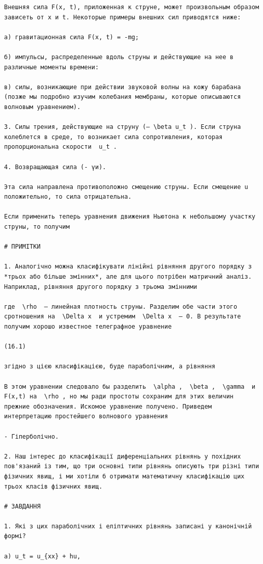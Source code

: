 \documentclass[
  ukrainian,
]{article}
\begin{document}
\begin{verbatim}
Внешняя сила F(x, t), приложенная к струне, может произвольным образом зависеть от x и t. Некоторые примеры внешних сил приводятся ниже:

а) гравитационная сила F(x, t) = -mg;

б) импульсы, распределенные вдоль струны и действующие на нее в различные моменты времени:

в) силы, возникающие при действии звуковой волны на кожу барабана (позже мы подробно изучим колебания мембраны, которые описываются волновым уравнением).

3. Силы трения, действующие на струну (— \beta u_t ). Если струна колеблется в среде, то возникает сила сопротивления, которая пропорциональна скорости  u_t .

4. Возвращающая сила (- үи).

Эта сила направлена противоположно смещению струны. Если смещение u положительно, то сила отрицательна.

Если применить теперь уравнения движения Ньютона к небольшому участку струны, то получим

# ПРИМІТКИ

1. Аналогічно можна класифікувати лінійні рівняння другого порядку з *трьох або більше змінних*, але для цього потрібен матричний аналіз. Наприклад, рівняння другого порядку з трьома змінними

где  \rho  — линейная плотность струны. Разделим обе части этого сротношения на  \Delta x  и устремим  \Delta x  — 0. В результате получим хорошо известное телеграфное уравнение

(16.1)

згідно з цією класифікацією, буде параболічним, а рівняння

В этом уравнении следовало бы разделить  \alpha ,  \beta ,  \gamma  и F(x,t) на  \rho , но мы ради простоты сохраним для этих величин прежние обозначения. Искомое уравнение получено. Приведем интерпретацию простейшего волнового уравнения

- Гіперболічно.

2. Наш інтерес до класифікації диференціальних рівнянь у похідних пов'язаний із тим, що три основні типи рівнянь описують три різні типи фізичних явищ, і ми хотіли б отримати математичну класифікацію цих трьох класів фізичних явищ.

# ЗАВДАННЯ

1. Які з цих параболічних і еліптичних рівнянь записані у канонічній формі?

a) u_t = u_{xx} + hu,


\end{verbatim}
\end{document}
